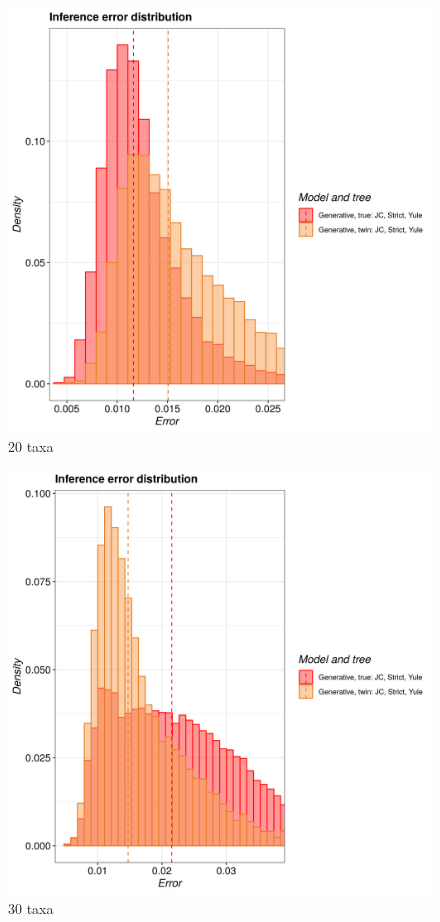 \begin{figure}[H]
  \includegraphics[width=\textwidth]{pirouette_example_20/example_20_315/errors.png}
  \caption{20 taxa}
\end{figure}

\begin{figure}[H]
  \includegraphics[width=\textwidth]{pirouette_example_20/example_20_316/errors.png}
  \caption{30 taxa}
\end{figure}


